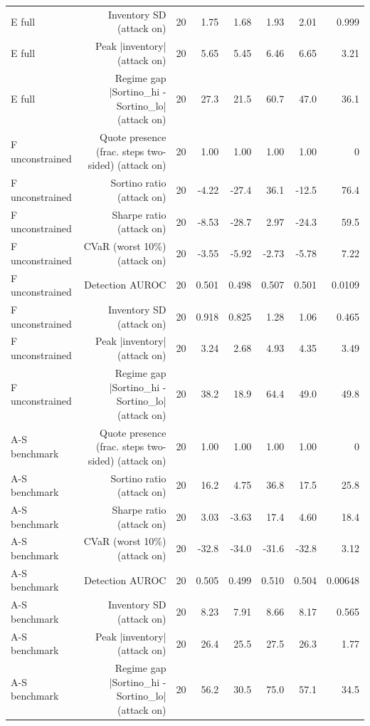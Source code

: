 \begin{table}[htbp]
\begin{tabular}{lrrrrrrr}
    E  full & Inventory SD (attack on) & 20 & 1.75 & 1.68 & 1.93 & 2.01 & 0.999 \\
    E  full & Peak |inventory| (attack on) & 20 & 5.65 & 5.45 & 6.46 & 6.65 & 3.21 \\
    E  full & Regime gap  |Sortino\_hi - Sortino\_lo| (attack on) & 20 & 27.3 & 21.5 & 60.7 & 47.0 & 36.1 \\
    F  unconstrained & Quote presence (frac. steps two-sided) (attack on) & 20 & 1.00 & 1.00 & 1.00 & 1.00 & 0 \\
    F  unconstrained & Sortino ratio (attack on) & 20 & -4.22 & -27.4 & 36.1 & -12.5 & 76.4 \\
    F  unconstrained & Sharpe ratio (attack on) & 20 & -8.53 & -28.7 & 2.97 & -24.3 & 59.5 \\
    F  unconstrained & CVaR (worst 10\%) (attack on) & 20 & -3.55 & -5.92 & -2.73 & -5.78 & 7.22 \\
    F  unconstrained & Detection AUROC & 20 & 0.501 & 0.498 & 0.507 & 0.501 & 0.0109 \\
    F  unconstrained & Inventory SD (attack on) & 20 & 0.918 & 0.825 & 1.28 & 1.06 & 0.465 \\
    F  unconstrained & Peak |inventory| (attack on) & 20 & 3.24 & 2.68 & 4.93 & 4.35 & 3.49 \\
    F  unconstrained & Regime gap  |Sortino\_hi - Sortino\_lo| (attack on) & 20 & 38.2 & 18.9 & 64.4 & 49.0 & 49.8 \\
    A-S benchmark & Quote presence (frac. steps two-sided) (attack on) & 20 & 1.00 & 1.00 & 1.00 & 1.00 & 0 \\
    A-S benchmark & Sortino ratio (attack on) & 20 & 16.2 & 4.75 & 36.8 & 17.5 & 25.8 \\
    A-S benchmark & Sharpe ratio (attack on) & 20 & 3.03 & -3.63 & 17.4 & 4.60 & 18.4 \\
    A-S benchmark & CVaR (worst 10\%) (attack on) & 20 & -32.8 & -34.0 & -31.6 & -32.8 & 3.12 \\
    A-S benchmark & Detection AUROC & 20 & 0.505 & 0.499 & 0.510 & 0.504 & 0.00648 \\
    A-S benchmark & Inventory SD (attack on) & 20 & 8.23 & 7.91 & 8.66 & 8.17 & 0.565 \\
    A-S benchmark & Peak |inventory| (attack on) & 20 & 26.4 & 25.5 & 27.5 & 26.3 & 1.77 \\
    A-S benchmark & Regime gap  |Sortino\_hi - Sortino\_lo| (attack on) & 20 & 56.2 & 30.5 & 75.0 & 57.1 & 34.5 \\

\end{tabular}
\end{table}
